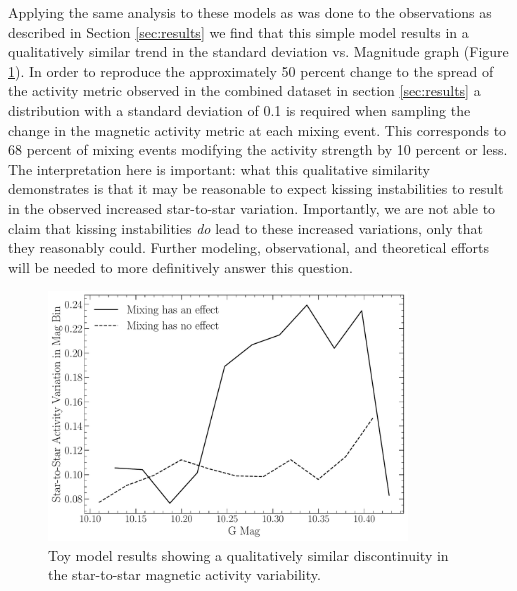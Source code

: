 Applying the same analysis to these models as was done to the observations as
described in Section \ref{sec:results} we find that this simple model results
in a qualitatively similar trend in the standard deviation vs. Magnitude graph
(Figure \ref{fig:model}). In order to reproduce the approximately 50 percent
change to the spread of the activity metric observed in the combined dataset in
section \ref{sec:results} a distribution with a standard deviation of 0.1 is
required when sampling the change in the magnetic activity metric at each
mixing event. This corresponds to 68 percent of mixing events modifying the
activity strength by 10 percent or less. The interpretation here is important:
what this qualitative similarity demonstrates is that it may be reasonable to
expect kissing instabilities to result in the observed increased star-to-star
variation. Importantly, we are not able to claim that kissing instabilities
\textit{do} lead to these increased variations, only that they reasonably
could. Further modeling, observational, and theoretical efforts will be needed
to more definitively answer this question.

\begin{figure}
  \centering
  \includegraphics[width=0.85\textwidth]{figures/jaoMagActivity/SpreadModel.pdf}
  \caption{Toy model results showing a qualitatively similar discontinuity in the star-to-star magnetic activity variability.}
  \label{fig:model}
\end{figure}

